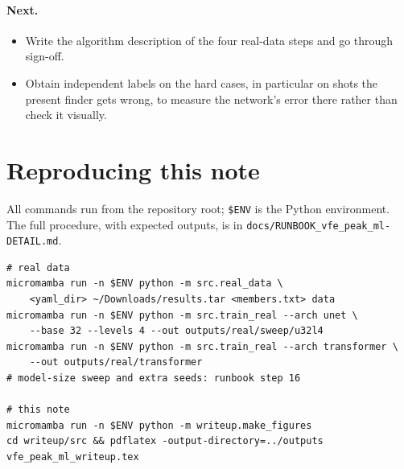 \documentclass[11pt,a4paper]{article}
\begin{document}
\paragraph{Next.}
\begin{itemize}
  \item Write the algorithm description of the four real-data steps and go through sign-off.
  \item Obtain independent labels on the hard cases, in particular on shots the present finder gets
        wrong, to measure the network's error there rather than check it visually.
\end{itemize}

\clearpage
\appendix
\section{Reproducing this note}
All commands run from the repository root; \texttt{\$ENV} is the Python environment. The full procedure,
with expected outputs, is in \texttt{docs/RUNBOOK\_vfe\_peak\_ml-DETAIL.md}.

\begin{small}
\begin{verbatim}
# real data
micromamba run -n $ENV python -m src.real_data \
    <yaml_dir> ~/Downloads/results.tar <members.txt> data
micromamba run -n $ENV python -m src.train_real --arch unet \
    --base 32 --levels 4 --out outputs/real/sweep/u32l4
micromamba run -n $ENV python -m src.train_real --arch transformer \
    --out outputs/real/transformer
# model-size sweep and extra seeds: runbook step 16

# this note
micromamba run -n $ENV python -m writeup.make_figures
cd writeup/src && pdflatex -output-directory=../outputs vfe_peak_ml_writeup.tex
\end{verbatim}
\end{small}
\end{document}
